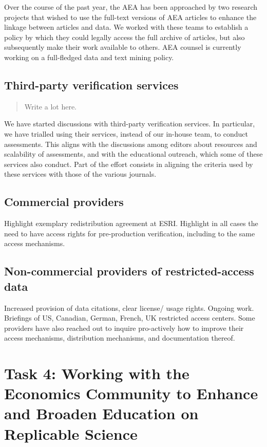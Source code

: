 \documentclass[PP]{AEA}
\begin{document}
Over the course of the past year, the AEA has been approached by two research projects that wished to use the full-text versions of AEA articles to enhance the linkage between articles and data. We worked with these teams to establish a policy by which they could legally access the full archive of articles, but also subsequently make their work available to others. AEA counsel is currently working on a full-fledged data and text mining policy.

\subsection{Third-party verification services}

\begin{quote}
    Write a lot here.
\end{quote}
We have started discussions with third-party verification services. In particular, we have trialled using their services, instead of our in-house team, to conduct assessments. This aligns with the discussions among editors about resources and scalability of assessments, and with the educational outreach, which some of these services also conduct. Part of the effort consists in aligning the criteria used by these services with those of the various journals.

\subsection{Commercial providers}

Highlight exemplary redistribution agreement at ESRI. Highlight in all cases the need to have access rights for pre-production verification, including to the same access mechanisms. 

\subsection{Non-commercial providers of restricted-access data}

Increased provision of data citations, clear license/ usage rights. Ongoing work. Briefings of US, Canadian, German, French, UK restricted access centers. Some providers have also reached out to inquire pro-actively how to improve their access mechanisms, distribution mechanisms, and documentation thereof.

\section{Task 4: Working with the Economics Community to Enhance and Broaden Education on Replicable Science}
\end{document}
